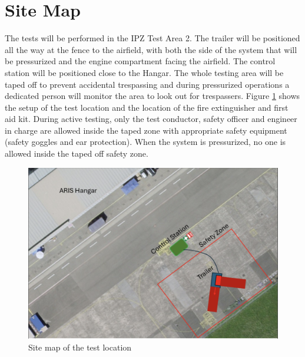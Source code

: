 \documentclass{article}
\begin{document}
\section{Site Map}
The tests will be performed in the IPZ Test Area 2. The trailer will be positioned all the way at the fence to the airfield, with both the side of the system that will be pressurized and the engine compartment facing the airfield. The control station will be positioned close to the Hangar. The whole testing area will be taped off to prevent accidental trespassing and during pressurized operations a dedicated person will monitor the area to look out for trespassers.
Figure \ref{fig:location-plan} shows the setup of the test location and the location of the fire extinguisher and first aid kit. During active testing, only the test conductor, safety officer and engineer in charge are allowed inside the taped zone with appropriate safety equipment (safety goggles and ear protection). When the system is pressurized, no one is allowed inside the taped off safety zone.
\begin{figure}[h]
    \centering
    \includegraphics[width=\textwidth]{assets/location-map.png}
    \caption{Site map of the test location}
    \label{fig:location-plan}
\end{figure}

\newpage
\end{document}
